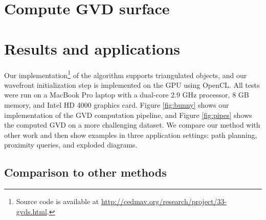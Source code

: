 \documentclass[submission]{gmp2017}
\begin{document}


\section{Compute GVD surface}
\label{sec:bisector}

\section{Results and applications}
Our implementation\footnote{Source code is available at \url{http://cedmav.org/research/project/33-gvds.html}.} of the algorithm supports  triangulated objects, and our wavefront initialization step is implemented on the GPU using OpenCL. All tests were run on a MacBook Pro laptop with a dual-core 2.9 GHz processor, 8 GB memory, and Intel HD 4000 graphics card. Figure \ref{fig:bunny} shows our implementation of the GVD computation pipeline, and Figure \ref{fig:pipes} shows the computed GVD on a more challenging dataset.  We compare our method with other work and then show examples in three application settings: path planning, proximity queries, and exploded diagrams.

\subsection{Comparison to other methods}


\end{document}
